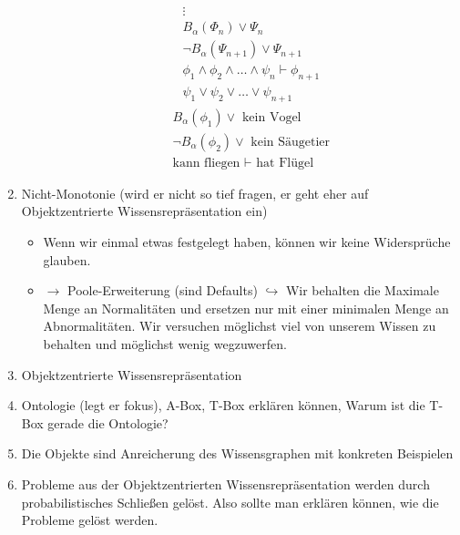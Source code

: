 \documentclass[runningheads,deutsch]{llncs}
\begin{document}
\begin{enumerate}
\begin{itemize}
\begin{align*}
            \vdots \\
            B_\alpha(\Phi_n) \lor \Psi_n \\
            \lnot B_\alpha(\Psi_{n+1}) \lor \Psi_{n+1} \\
            \phi_1 \land \phi_2 \land \dots \land \psi_n \vdash \phi_{n+1} \\
            \hline
            \psi_1 \lor \psi_2 \lor \dots \lor \psi_{n+1}
        \end{align*}
        \begin{align*}
            B_\alpha(\phi_1) \lor \text{ kein Vogel} \\
            \lnot B_\alpha(\phi_2) \lor \text{ kein Säugetier} \\
            \text{kann fliegen } \vdash \text{ hat Flügel}
        \end{align*}
    \end{itemize}
    \item Nicht-Monotonie (wird er nicht so tief fragen, er geht eher auf Objektzentrierte Wissensrepräsentation ein)
    \begin{itemize}
        \item Wenn wir einmal etwas festgelegt haben, können wir keine Widersprüche glauben. 
        \item $\rightarrow$ Poole-Erweiterung (sind Defaults) $\hookrightarrow$ Wir behalten die Maximale Menge an Normalitäten und ersetzen nur mit einer minimalen Menge an Abnormalitäten. Wir versuchen möglichst viel von unserem Wissen zu behalten und möglichst wenig wegzuwerfen.
    \end{itemize}
    \item Objektzentrierte Wissensrepräsentation
    \item Ontologie (legt er fokus), A-Box, T-Box erklären können, Warum ist die T-Box gerade die Ontologie?
    \item Die Objekte sind Anreicherung des Wissensgraphen mit konkreten Beispielen
    \item Probleme aus der Objektzentrierten Wissensrepräsentation werden durch probabilistisches Schließen gelöst. Also sollte man erklären können, wie die Probleme gelöst werden.
\end{enumerate}
\end{document}
